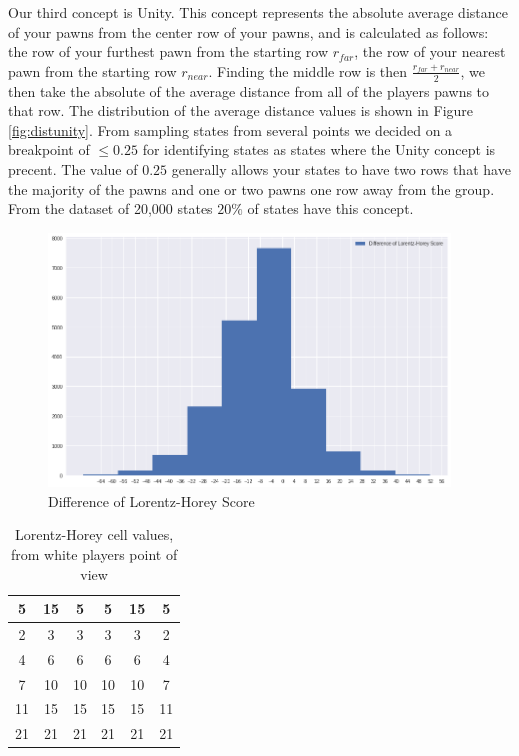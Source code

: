 Our third concept is Unity. This concept represents the absolute average distance of your pawns from the center row of your pawns, and is calculated as follows: the row of your furthest pawn from the starting row $r_{far}$, the row of your nearest pawn from the starting row $r_{near}$. Finding the middle row is then $\frac{r_{far} + r_{near}}{2}$, we then take the absolute of the average distance from all of the players pawns to that row. The distribution of the average distance values is shown in Figure \ref{fig:distunity}. From sampling states from several points we decided on a breakpoint of $\le 0.25$ for identifying states as states where the Unity concept is precent. The value of $0.25$ generally allows your states to have two rows that have the majority of the pawns and one or two pawns one row away from the group. From the dataset of 20,000 states $20\%$ of states have this concept.

\begin{figure}
    \begin{small}
        \begin{center}
            \includegraphics[width=0.95\textwidth]{graphics/dist_lorentz}
        \end{center}
        \caption{Difference of Lorentz-Horey Score}
        \label{fig:distlorentz}
    \end{small}
\end{figure}

\begin{table}[]
    \centering
    \begin{tabular}{|c|c|c|c|c|c|}
        \hline
        5  & 15 & 5  & 5  & 15 & 5  \\\hline
        2  & 3  & 3  & 3  & 3  & 2  \\\hline
        4  & 6  & 6  & 6  & 6  & 4  \\\hline
        7  & 10 & 10 & 10 & 10 & 7  \\\hline
        11 & 15 & 15 & 15 & 15 & 11 \\\hline
        21 & 21 & 21 & 21 & 21 & 21 \\\hline
    \end{tabular}
    \caption{Lorentz-Horey cell values, from white players point of view}
    \label{table:lorentzcell}
\end{table}

